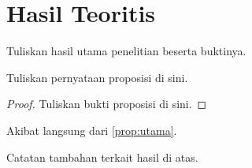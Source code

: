 \section{Hasil Teoritis}
Tuliskan hasil utama penelitian beserta buktinya.

\begin{proposisi}\label{prop:utama}
  Tuliskan pernyataan proposisi di sini.
\end{proposisi}
\begin{proof}
  Tuliskan bukti proposisi di sini.
\end{proof}

\begin{akibat}
  Akibat langsung dari \autoref{prop:utama}.
\end{akibat}

\begin{catatan}
  Catatan tambahan terkait hasil di atas.
\end{catatan}
